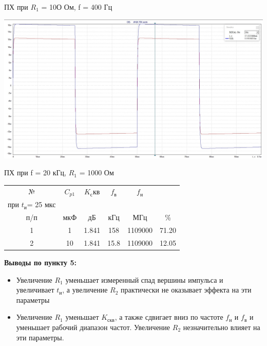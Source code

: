 \documentclass[a4paper,14pt]{extarticle}
\begin{document}
    ПХ при $R_1$ = 10О Ом, f = 400 Гц

    \begin{center}
        \includegraphics[scale=0.28]{5.5.jpg}
    \end{center}
    
    ПХ при f = 20 кГц, $R_1$ = 1000 Ом 

\begin{table}[ht]
    \small
    \begin{center}
        \begin{tabular}{|c|c|c|c|c|c|}
            \hline
            № & $C_{p1}$ & $K_скв$ & $f_в$ & $f_н$ & \parbox[c][1.5cm]{3cm}{\begin{center}∆ \\при $t_{\text{и}}$= 25 мкс \end{center}}
            \tabularnewline
            \hline
            п/п & мкФ & дБ & кГц & МГц & \%
            \tabularnewline
             & 1 & 1.841 & 158 & 1109000 & 71.20 
            \tabularnewline
             & 10 & 1.841 & 15.8 & 1109000 & 12.05
            \tabularnewline
            \hline
        \end{tabular}
    \end{center}
\end{table}

    \textbf{Выводы по пункту 5:}
    \vspace{-6ex}
    \begin{singlespace}
        \begin{itemize}
           \item Увеличение $R_1$ уменьшает измеренный спад вершины импульса и увеличивает 
           $t_{\text{и}}$, а увеличение $R_2$ практически не оказывает эффекта на эти параметры 
           \item Увеличение $R_1$ уменьшает $K_{\text{скв}}$, а также сдвигает вниз по 
           частоте $f_{\text{н}}$ и $f_{\text{в}}$ и уменьшает рабочий диапазон частот. 
           Увеличение $R_2$ незначительно влияет на эти параметры.
        \end{itemize}
    \end{singlespace}
\end{document}
